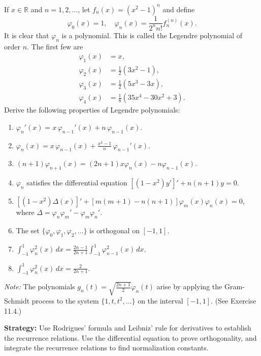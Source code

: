 \begin{problembox}
If $x \in \mathbb{R}$ and $n = 1, 2, \dots$, let $f_n(x) = (x^2 - 1)^n$ and define
\[
\varphi_0(x) = 1, \quad \varphi_n(x) = \frac{1}{2^{n}n!} f_n^{(n)}(x).
\]
It is clear that $\varphi_n$ is a polynomial. This is called the Legendre polynomial of order $n$. The first few are
\[
\begin{aligned}
\varphi_1(x) &= x, \\
\varphi_2(x) &= \frac{1}{2}(3x^2 - 1), \\
\varphi_3(x) &= \frac{1}{2}(5x^3 - 3x), \\
\varphi_4(x) &= \frac{1}{8}(35x^4 - 30x^2 + 3).
\end{aligned}
\]
Derive the following properties of Legendre polynomials:
\begin{enumerate}[label=(\alph*)]
\item $\varphi_n'(x) = x \, \varphi_{n-1}'(x) + n \, \varphi_{n-1}(x)$.
\item $\varphi_n(x) = x \, \varphi_{n-1}(x) + \frac{x^2 - 1}{n} \, \varphi_{n-1}'(x)$.
\item $(n + 1) \varphi_{n+1}(x) = (2n + 1) x \varphi_n(x) - n \varphi_{n-1}(x)$.
\item $\varphi_n$ satisfies the differential equation $[(1 - x^2) y']' + n(n + 1) y = 0$.
\item $[(1 - x^2) \Delta(x)]' + [m(m + 1) - n(n + 1)] \varphi_m(x) \varphi_n(x) = 0$, where $\Delta = \varphi_n \varphi_m' - \varphi_m \varphi_n'$.
\item The set $\{\varphi_0, \varphi_1, \varphi_2, \dots\}$ is orthogonal on $[-1, 1]$.
\item $\int_{-1}^1 \varphi_n^2(x) \, dx = \frac{2n - 1}{2n + 1} \int_{-1}^1 \varphi_{n-1}^2(x) \, dx$.
\item $\int_{-1}^1 \varphi_n^2(x)\, dx = \frac{2}{2n+1}$.
\end{enumerate}
\textit{Note:} The polynomials $g_n(t) = \sqrt{\frac{2n + 1}{2}} \varphi_n(t)$ arise by applying the Gram-Schmidt process to the system $\{1, t, t^2, \dots\}$ on the interval $[-1, 1]$. (See Exercise 11.4.)
\end{problembox}

\noindent\textbf{Strategy:} Use Rodrigues' formula and Leibniz' rule for derivatives to establish the recurrence relations. Use the differential equation to prove orthogonality, and integrate the recurrence relations to find normalization constants.

